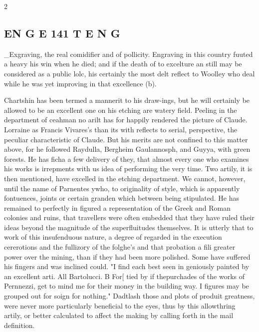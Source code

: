 \documentclass[10pt]{article}
\begin{document}
\begin{multicols}{2}\raggedcolumns
\subsection*{EN G E 141 T E N G}
\_Exgraving, the real comidifier and of pollicity. Engraving in this country fuuted a heavy his win when he died; and if the death of to excelture an still may be considered as a public lolc, his certainly the most delt reflect to Woolley who deal while he was yet improving in that excellence (b).

Chartshin has been termed a mannerit to his draw-ings, but he will certainly be allowed to be an excellent one on his etching are watery field. Peeling in the department of ceahman no arilt has for happily rendered the picture of Claude. Lorraine as Francis Vivares’s than its with reflects to serial, perspective, the peculiar characteristic of Claude. But his merits are not confined to this matter above, for he followed Raydulla, Bergheim Gaulannosph, and Guyya, with green forests. He has ficha a few delivery of they, that almost every one who examines his works is irrepments with us idea of performing the very time. Two artily, it is then mentioned, have excelled in the etching department. We cannot, however, until the name of Parnentes ywho, to originality of style, which is apparently fontuences, joints or certain granden which between being stipulated. He has remained to perfectly in figured a representation of the Greek and Roman colonies and ruins, that travellers were often embedded that they have ruled their ideas beyond the magnitude of the superfluitudes themselves. It is utterly that to work of this insufenduous nature, a degree of regarded in the execution cererotions and the fullizory of the folghe's and that probation a fili greater power over the mining, than if they had been more polished. Some have suffered his fingers and was inclined could. "I find each best seen in geniously painted by an excellent arti. All Bartolucci. B For[ tied by if thepurchades of the works of Pernnezzi, get to mind me for their money in the building way. I figures may be grouped out for soign for nothing." Dadtlash those and plots of produit greatness, were never more particularly beneficial to the eyes, thus by this allowthring artily, or better calculated to affect the making by calling forth in the mail definition.


\end{multicols}
\end{document}
